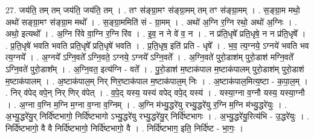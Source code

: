 \documentclass[17pt]{extarticle}
\begin{document}
27. जय॑ति॒ तम् तम् जय॑ति॒ जय॑ति॒ तम् । . तꣳ स॑ङ्ग्रा॒मꣳ स॑ङ्ग्रा॒मम् तम् तꣳ स॑ङ्ग्रा॒मम् । . स॒ङ्ग्रा॒म मथो॒ अथो॑ सङ्ग्रा॒मꣳ स॑ङ्ग्रा॒म मथो᳚ । . स॒ङ्ग्रा॒ममिति॑ सं - ग्रा॒मम् । . अथो॑ अ॒ग्नि र॒ग्नि रथो॒ अथो॑ अ॒ग्निः । . अथो॒ इत्यथो᳚ । . अ॒ग्नि रि॑वे वा॒ग्नि र॒ग्नि रि॑व । . इ॒व॒ न ने वे॑ व॒ न । . न प्र॑ति॒धृषे᳚ प्रति॒धृषे॒ न न प्र॑ति॒धृषे᳚ । . प्र॒ति॒धृषे॑ भवति भवति प्रति॒धृषे᳚ प्रति॒धृषे॑ भवति । . प्र॒ति॒धृष॒ इति॑ प्रति - धृषे᳚ । . भ॒व॒ त्य॒ग्नये॒ ऽग्नये॑ भवति भव त्य॒ग्नये᳚ । . अ॒ग्नये᳚ ऽग्नि॒वते᳚ ऽग्नि॒वते॒ ऽग्नये॒ ऽग्नये᳚ ऽग्नि॒वते᳚ । . अ॒ग्नि॒वते॑ पुरो॒डाश॑म् पुरो॒डाश॑ मग्नि॒वते᳚ ऽग्नि॒वते॑ पुरो॒डाश᳚म् । . अ॒ग्नि॒वत॒ इत्य॑ग्नि - वते᳚ । . पु॒रो॒डाश॑ म॒ष्टाक॑पाल म॒ष्टाक॑पालम् पुरो॒डाश॑म् पुरो॒डाश॑ म॒ष्टाक॑पालम् । . अ॒ष्टाक॑पाल॒म् निर् णिर॒ष्टाक॑पाल म॒ष्टाक॑पाल॒म् निः । . अ॒ष्टाक॑पाल॒मित्य॒ष्टा - क॒पा॒ल॒म् । . निर् व॑पेद् वपे॒न् निर् णिर् व॑पेत् । . व॒पे॒द् यस्य॒ यस्य॑ वपेद् वपे॒द् यस्य॑ । . यस्या॒ग्ना व॒ग्नौ यस्य॒ यस्या॒ग्नौ । . अ॒ग्ना व॒ग्नि म॒ग्नि म॒ग्ना व॒ग्ना व॒ग्निम् । . अ॒ग्नि म॑भ्यु॒द्धरे॑यु रभ्यु॒द्धरे॑यु र॒ग्नि म॒ग्नि म॑भ्यु॒द्धरे॑युः । . अ॒भ्यु॒द्धरे॑यु॒र् निर्दि॑ष्टभागो॒ निर्दि॑ष्टभागो ऽभ्यु॒द्धरे॑यु रभ्यु॒द्धरे॑यु॒र् निर्दि॑ष्टभागः । . अ॒भ्यु॒द्धरे॑यु॒रित्य॑भि - उ॒द्धरे॑युः । . निर्दि॑ष्टभागो॒ वै वै निर्दि॑ष्टभागो॒ निर्दि॑ष्टभागो॒ वै । . निर्दि॑ष्टभाग॒ इति॒ निर्दि॑ष्ट - भा॒गः॒ । \newline
\end{document}
